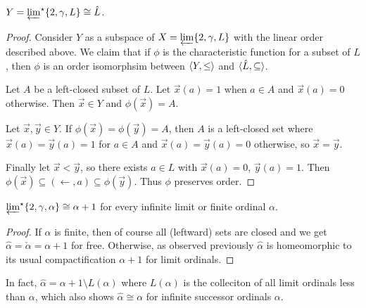 \documentclass[11pt]{article}
\newcommand{\vect}{\vec}
\begin{document}
  \begin{theorem}
    \(Y=\varprojlim^\star \{2, \gamma, L\}\cong \hat L\).
  \end{theorem}

  \begin{proof}
    Consider \(Y\) as a subspace of \(X=\varprojlim \{2, \gamma, L\}\) with
    the linear order described above. We claim that if \(\phi\) is the
    characteristic function for a subset of \(L\), then \(\phi\)
    is an order isomorphsim between \(\langle Y,\leq\rangle\) and
    \(\langle\hat L,\subseteq\rangle\).

    Let \(A\) be a left-closed subset of \(L\). Let \(\vect x(a)=1\) when
    \(a\in A\) and \(\vect x(a)=0\) otherwise. Then \(\vect x\in Y\) and
    \(\phi(\vect x)=A\).

    Let \(\vect x,\vect y\in Y\). If
    \(\phi(\vect x)=\phi(\vect y)=A\), then \(A\) is a
    left-closed set where \(\vect x(a)=\vect y(a)=1\) for \(a\in A\)
    and \(\vect x(a)=\vect y(a)=0\) otherwise, so \(\vect x=\vect y\).

    Finally let \(\vect x<\vect y\), so there exists \(a\in L\) with
    \(\vect x(a)=0\), \(\vect y(a)=1\). Then
    \(
      \phi(\vect x)
        \subseteq
      (\leftarrow,a)
        \subseteq
      \phi(\vect y)
    \). Thus \(\phi\) preserves order.
  \end{proof}

  \begin{corollary}
    \(
      \varprojlim^\star \{2, \gamma, \alpha\}
      \cong
      \alpha+1
    \)
    for every infinite limit or finite ordinal \(\alpha\).
  \end{corollary}

  \begin{proof}
    If \(\alpha\) is finite, then of course all (leftward) sets are
    closed and we get \(\hat\alpha=\check\alpha=\alpha+1\) for free.
    Otherwise, as observed previously \(\hat\alpha\)
    is homeomorphic to its usual compactification \(\alpha+1\) for
    limit ordinals.
  \end{proof}

  In fact, \(\hat\alpha=\alpha+1\setminus L(\alpha)\) where \(L(\alpha)\)
  is the colleciton of all limit ordinals less than \(\alpha\), which also
  shows \(\hat\alpha\cong\alpha\) for infinite successor ordinals \(\alpha\).

\newpage


\end{document}
